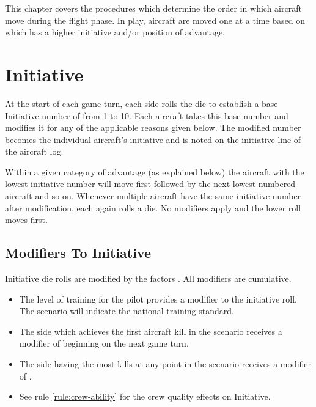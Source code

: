 
\label{rule:order-of-flight}

This chapter covers the procedures which determine the order in which aircraft move during the flight phase. In play, aircraft are moved one at a time based on which has a higher initiative and/or position of advantage.

\section{Initiative}
\label{rule:initiative}

At the start of each game-turn, each side rolls the die to establish a base Initiative number of from 1 to 10. Each aircraft takes this base number and modifies it for any of the applicable reasons given below. The modified number becomes the individual aircraft's initiative and is noted on the initiative line of the aircraft log.

Within a given category of advantage (as explained below) the aircraft with the lowest initiative number will move first followed by the next lowest numbered aircraft and so on. Whenever multiple aircraft have the same initiative number after modification, each again rolls a die. No modifiers apply and the lower roll moves first.

\subsection{Modifiers To Initiative} Initiative die rolls are modified by the factors . All modifiers are cumulative.


\begin{itemize}

    \item{} The level of training for the pilot provides a modifier to the initiative roll. The scenario will indicate the national training standard.

    \item{} The side which achieves the first aircraft kill in the scenario receives a modifier of  beginning on the next game turn.

    \item{} The side having the most kills at any point in the scenario receives a modifier of .

    \item{} See rule \ref{rule:crew-ability} for the crew quality effects on Initiative.
\end{itemize}

